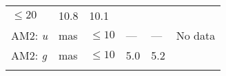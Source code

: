 \documentclass[DM, lsstdraft, toc]{lsstdoc}
\begin{document}
\begin{longtable}[]{@{}llllll@{}}
\begin{minipage}[t]{0.14\columnwidth}
\(\leq 20\)\strut
\end{minipage} & \begin{minipage}[t]{0.12\columnwidth}\raggedright\strut
10.8\strut
\end{minipage} & \begin{minipage}[t]{0.12\columnwidth}\raggedright\strut
10.1\strut
\end{minipage} & \begin{minipage}[t]{0.17\columnwidth}\raggedright\strut
\strut
\end{minipage}\tabularnewline
\begin{minipage}[t]{0.12\columnwidth}\raggedright\strut
AM2: \emph{u}\strut
\end{minipage} & \begin{minipage}[t]{0.06\columnwidth}\raggedright\strut
mas\strut
\end{minipage} & \begin{minipage}[t]{0.14\columnwidth}\raggedright\strut
\(\leq 10\)\strut
\end{minipage} & \begin{minipage}[t]{0.12\columnwidth}\raggedright\strut
---\strut
\end{minipage} & \begin{minipage}[t]{0.12\columnwidth}\raggedright\strut
---\strut
\end{minipage} & \begin{minipage}[t]{0.17\columnwidth}\raggedright\strut
No data\strut
\end{minipage}\tabularnewline
\begin{minipage}[t]{0.12\columnwidth}\raggedright\strut
AM2: \emph{g}\strut
\end{minipage} & \begin{minipage}[t]{0.06\columnwidth}\raggedright\strut
mas\strut
\end{minipage} & \begin{minipage}[t]{0.14\columnwidth}\raggedright\strut
\(\leq 10\)\strut
\end{minipage} & \begin{minipage}[t]{0.12\columnwidth}\raggedright\strut
5.0\strut
\end{minipage} & \begin{minipage}[t]{0.12\columnwidth}\raggedright\strut
5.2\strut
\end{minipage} & \begin{minipage}[t]{0.17\columnwidth}\raggedright\strut
\strut
\end{minipage}\tabularnewline
\begin{minipage}[t]{0.12\columnwidth}\raggedright\strut

\end{minipage}
\end{longtable}
\end{document}
